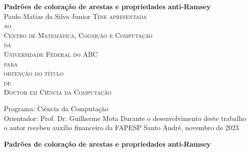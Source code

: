 \documentclass[12pt,a4paper]{book}
\begin{document}
 
\frontmatter 
\fancyhead[RO]{{\footnotesize\rightmark}\hspace{2em}\thepage}
\setcounter{tocdepth}{2}
\setcounter{secnumdepth}{3}
\fancyhead[LE]{\thepage\hspace{2em}\footnotesize{\leftmark}}
\fancyhead[RE,LO]{}
\fancyhead[RO]{{\footnotesize\rightmark}\hspace{2em}\thepage}

\doublespacing %

\thispagestyle{empty}
\begin{center}
    \vspace*{2cm}
    \textbf{\Large{Padrões de coloração de arestas e propriedades anti-Ramsey }}\\
    
    \vspace*{1.1cm}
    \Large{Paulo Matias da Silva Junior}    
    \vskip 2cm
    \textsc{
    Tese apresentada\\[-0.3cm] 
    ao\\[-0.3cm]
    Centro de Matemática, Cognição e Computação\\[-0.3cm]
    da\\[-0.3cm]
    Universidade Federal do ABC\\[-0.3cm]
    para\\[-0.3cm]
    obtenção do título\\[-0.3cm]
    de\\[-0.3cm]
    Doutor em Ciência da Computação}
    
    \vskip 1.3cm
    Programa: Ciência da Computação\\
    Orientador: Prof. Dr. Guilherme Mota
   	\vskip 1cm
    \normalsize{Durante o desenvolvimento deste trabalho o autor recebeu auxílio
    financeiro da FAPESP}    
    \vskip 0.4cm
    \normalsize{Santo André, novembro de 2023}
\end{center}


%
%
%
\newpage
\thispagestyle{empty}
    \begin{center}
        \vspace*{2.3 cm}
        \textbf{\Large{Padrões de coloração de arestas e propriedades anti-Ramsey }}\\
        \vspace*{2 cm}
    \end{center}
\end{document}
